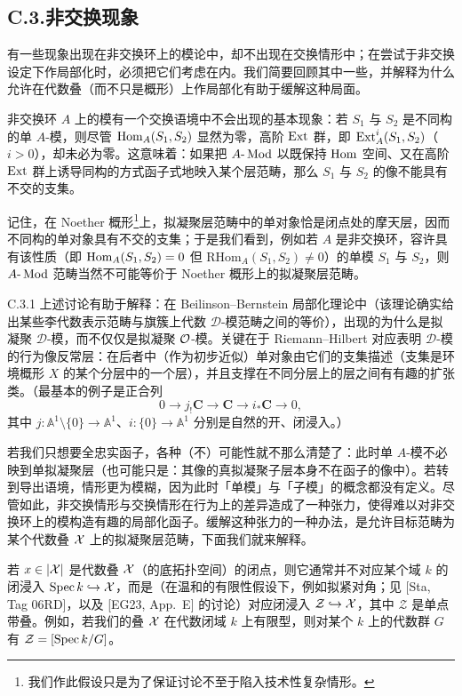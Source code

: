 \subsection*{C.3.\quad 非交换现象}

有一些现象出现在非交换环上的模论中，却不出现在交换情形中；在尝试于非交换设定下作局部化时，必须把它们考虑在内。我们简要回顾其中一些，并解释为什么允许在代数叠（而不只是概形）上作局部化有助于缓解这种局面。

非交换环 $A$ 上的模有一个交换语境中不会出现的基本现象：若 $S_1$ 与 $S_2$ 是不同构的单 $A$-模，则尽管 $\operatorname{Hom}_A(S_1,S_2)$ 显然为零，高阶 $\operatorname{Ext}$ 群，即 $\operatorname{Ext}^i_A(S_1,S_2)$（$i>0$），却未必为零。这意味着：如果把 $A\text{-}\operatorname{Mod}$ 以既保持 $\operatorname{Hom}$ 空间、又在高阶 $\operatorname{Ext}$ 群上诱导同构的方式函子式地映入某个层范畴，那么 $S_1$ 与 $S_2$ 的像不能具有不交的支集。


记住，在 Noether 概形\footnote{我们作此假设只是为了保证讨论不至于陷入技术性复杂情形。}上，拟凝聚层范畴中的单对象恰是闭点处的摩天层，因而不同构的单对象具有不交的支集；于是我们看到，例如若 $A$ 是非交换环，容许具有该性质（即 $\operatorname{Hom}_A(S_1,S_2)=0$ 但 $\mathrm{RHom}_A(S_1,S_2)\neq0$）的单模 $S_1$ 与 $S_2$，则 $A\text{-}\operatorname{Mod}$ 范畴当然不可能等价于 Noether 概形上的拟凝聚层范畴。

\begin{rem}{C.3.1}\label{thm:a4-19-6}
上述讨论有助于解释：在 Beilinson--Bernstein 局部化理论中（该理论确实给出某些李代数表示范畴与旗簇上代数 $\mathcal D$-模范畴之间的等价），出现的为什么是拟凝聚 $\mathcal D$-模，而不仅仅是拟凝聚 $\mathcal{O}$-模。关键在于 Riemann--Hilbert 对应表明 $\mathcal D$-模的行为像反常层：在后者中（作为初步近似）单对象由它们的支集描述（支集是环境概形 $X$ 的某个分层中的一个层），并且支撑在不同分层上的层之间有有趣的扩张类。（最基本的例子是正合列
\[
0\to j_!\mathbf C\to\mathbf C\to i_*\mathbf C\to0,
\]
其中 $j:\mathbb A^1\setminus\{0\}\to\mathbb A^1$、$i:\{0\}\to\mathbb A^1$ 分别是自然的开、闭浸入。）
\end{rem}

若我们只想要全忠实函子，各种（不）可能性就不那么清楚了：此时单 $A$-模不必映到单拟凝聚层（也可能只是：其像的真拟凝聚子层本身不在函子的像中）。若转到导出语境，情形更为模糊，因为此时「单模」与「子模」的概念都没有定义。尽管如此，非交换情形与交换情形在行为上的差异造成了一种张力，使得难以对非交换环上的模构造有趣的局部化函子。缓解这种张力的一种办法，是允许目标范畴为某个代数叠 $\mathcal{X}$ 上的拟凝聚层范畴，下面我们就来解释。

若 $x\in|\mathcal{X}|$ 是代数叠 $\mathcal{X}$（的底拓扑空间）的闭点，则它通常并不对应某个域 $k$ 的闭浸入 $\operatorname{Spec} k\hookrightarrow\mathcal{X}$，而是（在温和的有限性假设下，例如拟紧对角；见 [Sta, Tag 06RD]，以及 [EG23, App.~E] 的讨论）对应闭浸入 $\mathcal Z\hookrightarrow\mathcal{X}$，其中 $\mathcal Z$ 是单点带叠。例如，若我们的叠 $\mathcal{X}$ 在代数闭域 $k$ 上有限型，则对某个 $k$ 上的代数群 $G$ 有 $\mathcal Z=[\operatorname{Spec} k/G]$。

